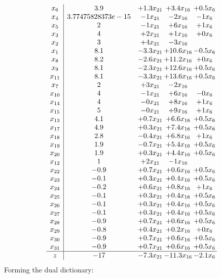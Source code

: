 \documentclass[11pt]{article}
\begin{document}
\[\begin{array}{c| c c@{\hskip 2pt} c@{\hskip 2pt} c@{\hskip 2pt} }
 x_{6}   &  3.9 & + 1.3 x_{21} & + 3.4 x_{16} & + 0.5 x_{6}\\
 x_{4}   &  3.77475828373e-15 & -1 x_{21} & -2 x_{16} & -1 x_{6}\\
 x_{5}   &  2 & -1 x_{21} & + 6 x_{16} & + 1 x_{6}\\
 x_{3}   &  4 & + 2 x_{21} & + 1 x_{16} & + 0 x_{6}\\
 x_{2}   &  3 & + 4 x_{21} & -3 x_{16} &   \\
 x_{1}   &  8.1 & -3.3 x_{21} & + 10.6 x_{16} & -0.5 x_{6}\\
 x_{8}   &  8.2 & -2.6 x_{21} & + 11.2 x_{16} & + 0 x_{6}\\
 x_{9}   &  8.1 & -2.3 x_{21} & + 12.6 x_{16} & + 0.5 x_{6}\\
 x_{11}   &  8.1 & -3.3 x_{21} & + 13.6 x_{16} & + 0.5 x_{6}\\
 x_{7}   &  2 & + 3 x_{21} & -2 x_{16} &   \\
 x_{10}   &  4 & -1 x_{21} & + 6 x_{16} & -0 x_{6}\\
 x_{14}   &  4 & -0 x_{21} & + 8 x_{16} & + 1 x_{6}\\
 x_{15}   &  5 & -0 x_{21} & + 9 x_{16} & + 1 x_{6}\\
 x_{13}   &  4.1 & + 0.7 x_{21} & + 6.6 x_{16} & + 0.5 x_{6}\\
 x_{17}   &  4.9 & + 0.3 x_{21} & + 7.4 x_{16} & + 0.5 x_{6}\\
 x_{18}   &  2.8 & -0.4 x_{21} & + 6.8 x_{16} & + 1 x_{6}\\
 x_{19}   &  1.9 & -0.7 x_{21} & + 5.4 x_{16} & + 0.5 x_{6}\\
 x_{20}   &  1.9 & + 0.3 x_{21} & + 4.4 x_{16} & + 0.5 x_{6}\\
 x_{12}   &  1 & + 2 x_{21} & -1 x_{16} &   \\
 x_{22}   &  -0.9 & + 0.7 x_{21} & + 0.6 x_{16} & + 0.5 x_{6}\\
 x_{23}   &  -0.1 & + 0.3 x_{21} & + 0.4 x_{16} & + 0.5 x_{6}\\
 x_{24}   &  -0.2 & + 0.6 x_{21} & + 0.8 x_{16} & + 1 x_{6}\\
 x_{25}   &  -0.1 & + 0.3 x_{21} & + 0.4 x_{16} & + 0.5 x_{6}\\
 x_{26}   &  -0.1 & + 0.3 x_{21} & + 0.4 x_{16} & + 0.5 x_{6}\\
 x_{27}   &  -0.1 & + 0.3 x_{21} & + 0.4 x_{16} & + 0.5 x_{6}\\
 x_{28}   &  -0.9 & + 0.7 x_{21} & + 0.6 x_{16} & + 0.5 x_{6}\\
 x_{29}   &  -0.8 & + 0.4 x_{21} & + 0.2 x_{16} & + 0 x_{6}\\
 x_{30}   &  -0.9 & + 0.7 x_{21} & + 0.6 x_{16} & + 0.5 x_{6}\\
 x_{31}   &  -0.9 & + 0.7 x_{21} & + 0.6 x_{16} & + 0.5 x_{6}\\
\hline
z    &  -17 & -7.3 x_{21} & -11.3 x_{16} & -2.1 x_{6}\\
\end{array}\]
Forming the dual dictionary:
\end{document}
